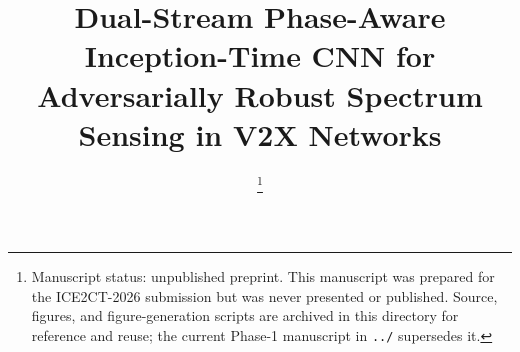 \documentclass[conference]{IEEEtran}
\begin{document}
\title{Dual-Stream Phase-Aware Inception-Time CNN for\\Adversarially Robust Spectrum Sensing in V2X Networks}

\author{
\thanks{Manuscript status: unpublished preprint. This manuscript was
prepared for the ICE2CT-2026 submission but was never presented or
published. Source, figures, and figure-generation scripts are archived
in this directory for reference and reuse; the current Phase-1
manuscript in \texttt{../} supersedes it.}
}

\maketitle
\end{document}
